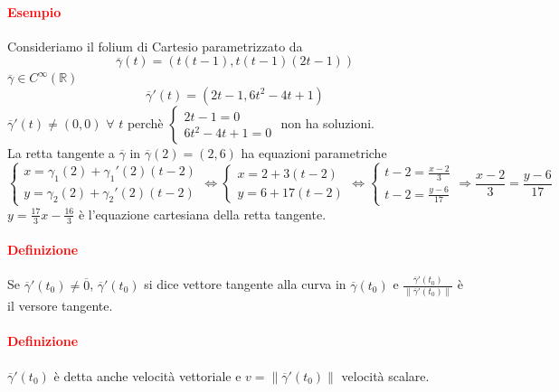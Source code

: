 \documentclass{article}
\newcommand{\R}{\mathbb{R}}
\begin{document}
\paragraph{\textcolor{red}{Esempio}}
Consideriamo il folium di Cartesio parametrizzato da 
\begin{equation*}
    \overline{\gamma}(t)=\left(t(t-1),t(t-1)(2t-1)\right)
\end{equation*}
$\overline{\gamma}\in C^\infty(\R)$\\
\begin{equation*}
    \overline{\gamma}' (t)=(2t-1,6t^2-4t+1)
\end{equation*}
$\overline{\gamma}' (t) \neq (0,0)\,\, \forall\,\, t$ perchè $\begin{cases}
    2t-1=0\\
    6t^2-4t+1=0
\end{cases}$ non ha soluzioni.\\
La retta tangente a $\overline{\gamma}$ in $\overline{\gamma}(2)=(2,6)$ ha equazioni parametriche
\begin{equation*}
\begin{cases}
    x=\gamma_1(2)+\gamma_1'(2)(t-2)\\
    y=\gamma_2(2)+\gamma_2'(2)(t-2)
\end{cases}
\Leftrightarrow \begin{cases}
    x=2+3(t-2)\\
    y=6+17(t-2)
\end{cases} \Leftrightarrow\begin{cases}
    t-2=\frac{x-2}{3}\\
    t-2=\frac{y-6}{17}
\end{cases}
    \Rightarrow \frac{x-2}{3}=\frac{y-6}{17}
\end{equation*}
$y=\frac{17}{3}x-\frac{16}{3}$ è l'equazione cartesiana della retta tangente.

\paragraph{\textcolor{red}{Definizione}}
Se $\overline{\gamma}'(t_0)\neq \overline{0}$, $\overline{\gamma}'(t_0)$ si dice vettore tangente alla curva in $\overline{\gamma}(t_0)$ e $\frac{\overline{\gamma}'(t_0)}{\|\overline{\gamma}'(t_0)\|}$ è il versore tangente.

\paragraph{\textcolor{red}{Definizione}}
$\overline{\gamma}'(t_0)$ è detta anche velocità vettoriale e $v= \|\overline{\gamma}'(t_0)\|$ velocità scalare.
\end{document}

